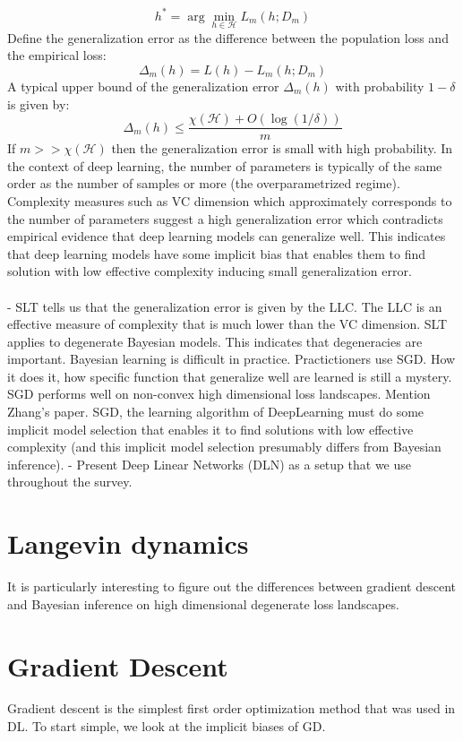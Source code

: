 \documentclass[11pt]{article}
\begin{document}
\begin{equation}
h^* = \arg\min_{h \in \mathcal{H}} L_m(h; D_m)
\end{equation}
Define the generalization error as the difference between the population loss and the empirical loss:
\begin{equation}
\Delta_m(h) = L(h) - L_m(h; D_m)
\end{equation}
A typical upper bound of the generalization error $\Delta_m(h)$ with probability $1-\delta$ is given by:
\begin{equation}
\Delta_m(h) \leq \frac{\chi(\mathcal{H}) + O(\log(1/\delta))}{m}
\end{equation}
If $m >> \chi(\mathcal{H})$ then the generalization error is small with high probability. In the context of deep learning, the number of parameters is typically of the same order as the number of samples or more (the overparametrized regime). Complexity measures such as VC dimension which approximately corresponds to the number of parameters suggest a high generalization error which contradicts empirical evidence that deep learning models can generalize well. This indicates that deep learning models have some implicit bias that enables them to find solution with low effective complexity inducing small generalization error.
\\
\\
- SLT tells us that the generalization error is given by the LLC. The LLC is an effective measure of complexity that is much lower than the VC dimension. SLT applies to degenerate Bayesian models. This indicates that degeneracies are important. Bayesian learning is difficult in practice. Practictioners use SGD. How it does it, how specific function that generalize well are learned is still a mystery. SGD performs well on non-convex high dimensional loss landscapes. Mention Zhang's paper. SGD, the learning algorithm of DeepLearning must do some implicit model selection that enables it to find solutions with low effective complexity (and this implicit model selection presumably differs from Bayesian inference).
- Present Deep Linear Networks (DLN) as a setup that we use throughout the survey.
\section{Langevin dynamics}
It is particularly interesting to figure out the differences between gradient descent and Bayesian inference on high dimensional degenerate loss landscapes. 


\section{Gradient Descent}
Gradient descent is the simplest first order optimization method that was used in DL. To start simple, we look at the implicit biases of GD. 
\end{document}
